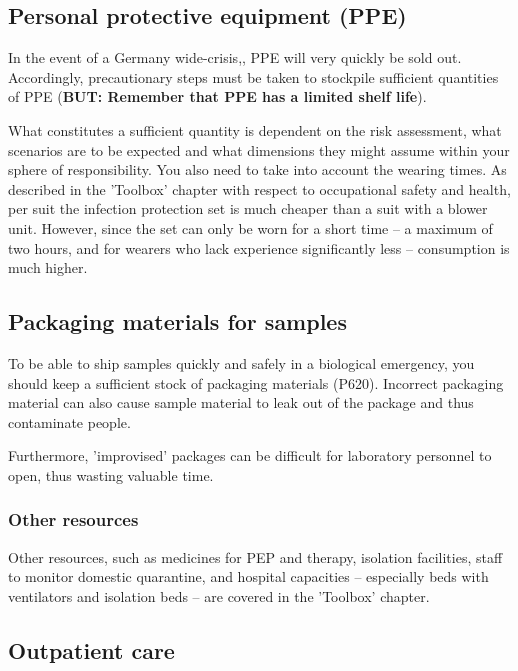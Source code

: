 \documentclass{article}
\begin{document}
\subsection{Personal protective equipment (PPE)}\label{H5686316}



In the event of a Germany wide-crisis,, PPE will very quickly be sold out. Accordingly, precautionary steps must be taken to stockpile sufficient quantities of PPE (\textbf{BUT: Remember that PPE has a limited shelf life}).


What constitutes a sufficient quantity is dependent on the risk assessment, what scenarios are to be expected and what dimensions they might assume within your sphere of responsibility. You also need to take into account the wearing times. As described in the 'Toolbox' chapter with respect to occupational safety and health, per suit the infection protection set is much cheaper than a suit with a blower unit. However, since the set can only be worn for a short time – a maximum of two hours, and for wearers who lack experience significantly less – consumption is much higher.


\subsection{Packaging materials for samples}\label{H2983418}



To be able to ship samples quickly and safely in a biological emergency, you should keep a sufficient stock of packaging materials (P620). Incorrect packaging material can also cause sample material to leak out of the package and thus contaminate people.


Furthermore, 'improvised' packages can be difficult for laboratory personnel to open, thus wasting valuable time.


\subsubsection{Other resources}\label{H9871200}



Other resources, such as medicines for PEP and therapy, isolation facilities, staff to monitor domestic quarantine, and hospital capacities – especially beds with ventilators and isolation beds – are covered in the 'Toolbox' chapter.


\subsection{Outpatient care}\label{H8927906}
\end{document}
